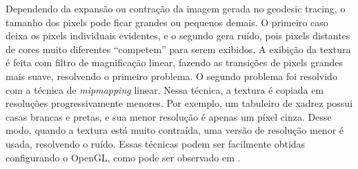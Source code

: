 Dependendo da expansão ou contração da imagem gerada no geodesic tracing,
o tamanho dos pixels pode ficar grandes ou pequenos demais. O primeiro caso
deixa os pixels individuais evidentes, e o segundo gera ruído, pois pixels distantes
de cores muito diferentes ``competem'' para serem exibidos.
A exibição da textura é feita com filtro de magnificação linear, fazendo as transições
de pixels grandes mais suave, resolvendo o primeiro problema.
O segundo problema foi resolvido com a técnica de \textit{mipmapping} linear.
Nessa técnica, a textura é copiada em resoluções progressivamente menores.
Por exemplo, um tabuleiro de xadrez possui casas brancas e pretas, e sua menor resolução
é apenas um píxel cinza. Desse modo, quando a textura está muito contraída, 
uma versão de resolução menor é usada, resolvendo o ruído.
Essas técnicas podem ser facilmente obtidas configurando o OpenGL,
como pode ser observado em \cite{LearnOpenGL}.
